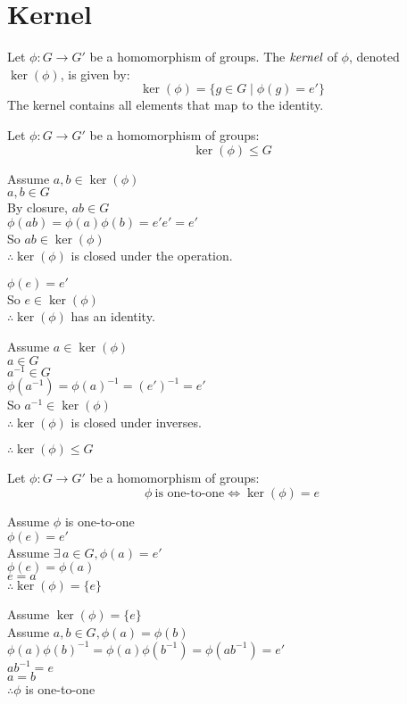 \documentclass[letterpaper,12pt,fleqn]{article}
\newcommand{\p}{\phi}
\begin{document}
\section*{Kernel}

\begin{definition}
  Let $\p:G\to G'$ be a homomorphism of groups. The $\emph{kernel}$ of $\p$,
  denoted $\ker(\p)$, is given by:
  \[\ker(\p)=\{g\in G\mid\p(g)=e'\}\]
  The kernel contains all elements that map to the identity.
\end{definition}

\begin{theorem}
  Let $\p:G\to G'$ be a homomorphism of groups:
  \[\ker(\p)\le G\]
\end{theorem}

\begin{theproof}
  Assume $a,b\in\ker(\p)$ \\
  $a,b\in G$ \\
  By closure, $ab\in G$ \\
  $\p(ab)=\p(a)\p(b)=e'e'=e'$ \\
  So $ab\in\ker(\p)$ \\
  $\therefore\ker(\p)$ is closed under the operation.

  $\p(e)=e'$ \\
  So $e\in\ker(\p)$ \\
  $\therefore\ker(\p)$ has an identity.

  Assume $a\in\ker(\p)$ \\
  $a\in G$ \\
  $a^{-1}\in G$ \\
  $\p(a^{-1})=\p(a)^{-1}=(e')^{-1}=e'$ \\
  So $a^{-1}\in\ker(\p)$ \\
  $\therefore\ker(\p)$ is closed under inverses.

  $\therefore\ker(\p)\le G$
\end{theproof}

\begin{theorem}
  Let $\p:G\to G'$ be a homomorphism of groups:
  \[\p\ \mbox{is one-to-one}\iff\ker(\p)=e\]
\end{theorem}
\newpage
\begin{theproof}
  \begin{minipage}[t]{3in}
    Assume $\p$ is one-to-one \\
    $\p(e)=e'$ \\
    Assume $\exists\,a\in G,\p(a)=e'$ \\
    $\p(e)=\p(a)$ \\
    $e=a$ \\
    $\therefore\ker(\p)=\{e\}$
  \end{minipage}
  \begin{minipage}[t]{3in}
    Assume $\ker(\p)=\{e\}$ \\
    Assume $a,b\in G,\p(a)=\p(b)$ \\
    $\p(a)\p(b)^{-1}=\p(a)\p(b^{-1})=\p(ab^{-1})=e'$ \\
    $ab^{-1}=e$ \\
    $a=b$ \\
    $\therefore\p$ is one-to-one
  \end{minipage}
\end{theproof}
\end{document}
